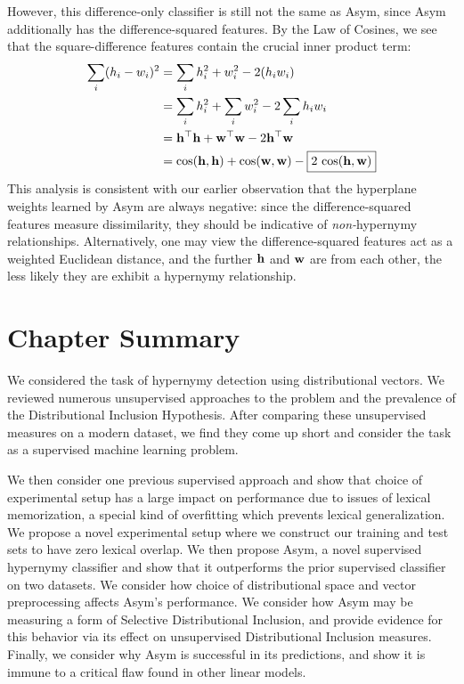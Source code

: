 However, this difference-only classifier is still not the same as Asym, since
Asym additionally has the difference-squared features.  By the Law of
Cosines, we see that the square-difference features contain the
crucial inner product term:
\begin{align*}
  \sum_i (h_i - w_i)^2 & = \sum_i h_i^2 + w_i^2 - 2({h}_i{w}_i)\\
  & = \sum_i h_i^2 + \sum_i w_i^2 - 2 \sum_i {h}_i{w}_i\\
  & = {\mathbf{h}}^{\top}{\mathbf{h}} + {\mathbf{w}}^{\top}{\mathbf{w}} - 2{\mathbf{h}}^{\top}{\mathbf{w}}\\
  & = \mbox{cos}({\mathbf{h}}, {\mathbf{h}}) + \mbox{cos}({\mathbf{w}}, {\mathbf{w}}) - \boxed{2~\mbox{cos}({\mathbf{h}}, {\mathbf{w}})}\\
\end{align*}
This analysis is consistent with our earlier observation that the hyperplane
weights learned by Asym are always negative: since the difference-squared features
measure dissimilarity, they should be
indicative of {\em non-}hypernymy relationships. Alternatively, one may view
the difference-squared features act as a weighted Euclidean distance,
and the further ${\mathbf{h}}$ and ${\mathbf{w}}$ are from each other, the less likely they
are exhibit a hypernymy relationship.

\section{Chapter Summary}

We considered the task of hypernymy detection using distributional vectors. We
reviewed numerous unsupervised approaches to the problem and the prevalence of
the Distributional Inclusion Hypothesis. After comparing these unsupervised
measures on a modern dataset, we find they come up short and consider the task
as a supervised machine learning problem.

We then consider one previous supervised approach and show that choice of
experimental setup has a large impact on performance due to issues of
lexical memorization, a special kind of overfitting which prevents lexical
generalization. We propose a novel experimental setup where we construct our
training and test sets to have zero lexical overlap. We then propose Asym, a
novel supervised hypernymy classifier and show that it outperforms the prior
supervised classifier on two datasets. We consider how choice of distributional
space and vector preprocessing affects Asym's performance. We consider how Asym
may be measuring a form of Selective Distributional Inclusion, and provide
evidence for this behavior via its effect on unsupervised Distributional
Inclusion measures. Finally, we consider why Asym is successful in its
predictions, and show it is immune to a critical flaw found in other linear
models.

